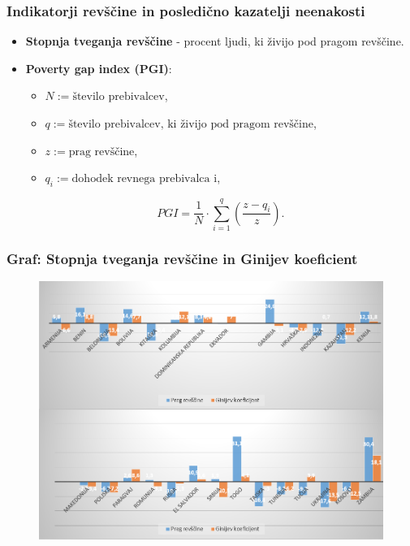 \documentclass[10pt]{beamer}
\begin{document}
\begin{frame}
\frametitle{Indikatorji revščine in posledično kazatelji neenakosti}
\begin{itemize}
\item \textbf{Stopnja tveganja revščine} - procent ljudi, ki živijo pod pragom revščine.

\item \textbf{Poverty gap index (PGI)}:
\begin{itemize}
\item $N := \textrm{število prebivalcev}$,
\item $q := \textrm{število prebivalcev, ki živijo pod pragom revščine}$,
\item $z := \textrm{prag revščine}$,
\item $q_i := \textrm{dohodek revnega prebivalca i}$,
\end{itemize}
$$
PGI = \frac{1}{N} \cdot \sum_{i=1}^q (\frac{z-q_i}{z}).
$$
\end{itemize}
\end{frame}


\begin{frame}
\frametitle{Graf: Stopnja tveganja revščine in Ginijev koeficient}
\begin{figure}
\includegraphics[scale = 0.8]{./slike/gini_revscina.png}
\end{figure}

\end{frame}
\end{document}
